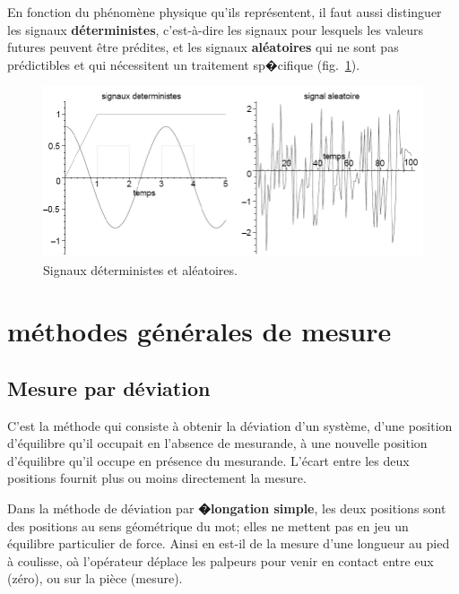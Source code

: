 \newpage
En fonction du phénomène physique qu'ils représentent, il faut aussi distinguer les signaux \textbf{déterministes}, c'est-à-dire les signaux pour lesquels les valeurs futures peuvent être prédites, et les signaux \textbf{aléatoires} qui ne sont pas prédictibles et qui nécessitent un traitement sp�cifique (fig.~\ref{fig:sigda}).
\begin{figure}[h]
   \centering
   \includegraphics[width=16cm]{assets/figures/sigda.pdf}
   \caption{Signaux déterministes et aléatoires.}
   \label{fig:sigda}
\end{figure}

\section{méthodes générales de mesure}

\subsection{Mesure par déviation}

C'est la méthode qui consiste à obtenir la déviation d'un système, d'une position d'équilibre qu'il occupait en l'absence de mesurande, à une nouvelle position d'équilibre qu'il occupe en présence du mesurande.  L'écart entre les deux positions fournit plus ou moins directement la mesure.

Dans la méthode de déviation par \textbf{�longation simple}, les deux positions sont des positions au sens géométrique du mot; elles ne mettent pas en jeu un équilibre particulier de force. Ainsi en est-il de la mesure d'une longueur au pied à coulisse, oà l'opérateur déplace les palpeurs pour venir en contact entre eux (zéro), ou sur la pièce (mesure).


